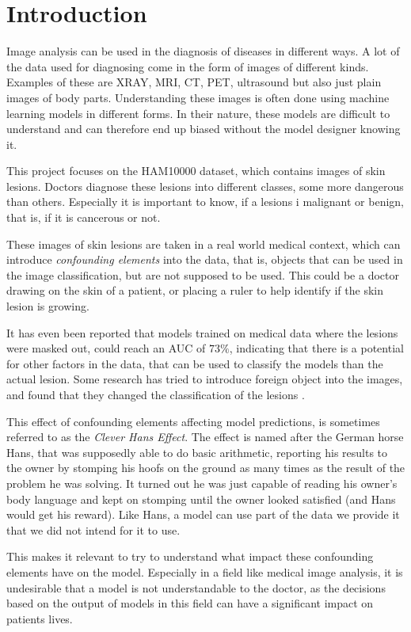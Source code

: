 \chapter{Introduction}\label{sec:introduction}
Image analysis can be used in the diagnosis of diseases in different ways.
A lot of the data used for diagnosing come in the form of images of different kinds.
Examples of these are XRAY, MRI, CT, PET, ultrasound but also just plain images of body parts.
Understanding these images is often done using machine learning models in different forms.
In their nature, these models are difficult to understand and can therefore end up biased without
the model designer knowing it.

This project focuses on the HAM10000 dataset\cite{Tschandl_2018}, which contains images of skin lesions.
Doctors diagnose these lesions into different classes, some more dangerous than others.
Especially it is important to know,
if a lesions i malignant or benign,
that is, if it is cancerous or not.

These images of skin lesions are taken in a real world medical context,
which can introduce \textit{confounding elements} into the data,
that is, objects that can be used in the image classification,
but are not supposed to be used.
This could be a doctor drawing on the skin of a patient,
or placing a ruler to help identify if the skin lesion is growing.

It has even been reported that models trained on medical data where the lesions were masked out,
could reach an AUC of $73\%$\cite{DeConstructing_Bias_on_Skin_Lesion_Datasets_2019},
indicating that there is a potential for other factors in the data,
that can be used to classify the models than the actual lesion.
Some research has tried to introduce foreign object into the images,
and found that they changed the classification of the lesions \cite{Towards_Explainable_Classifiers_Using_the_Counterfactual_Approach_2019}.

This effect of confounding elements affecting model predictions, 
is sometimes referred to as the \textit{Clever Hans Effect}.
The effect is named after the German horse Hans,
that was supposedly able to do basic arithmetic,
reporting his results to the owner by stomping his hoofs on the ground as many times as the result of the problem he was solving.
It turned out he was just capable of reading his owner's body language and kept on stomping until the owner looked satisfied (and Hans would get his reward).
Like Hans, a model can use part of the data we provide it that we did not intend for it to use.

This makes it relevant to try to understand what impact these confounding elements have on the model.
Especially in a field like medical image analysis,
it is undesirable that a model is not understandable to the doctor,
as the decisions based on the output of models in this field can have a significant impact on patients lives.